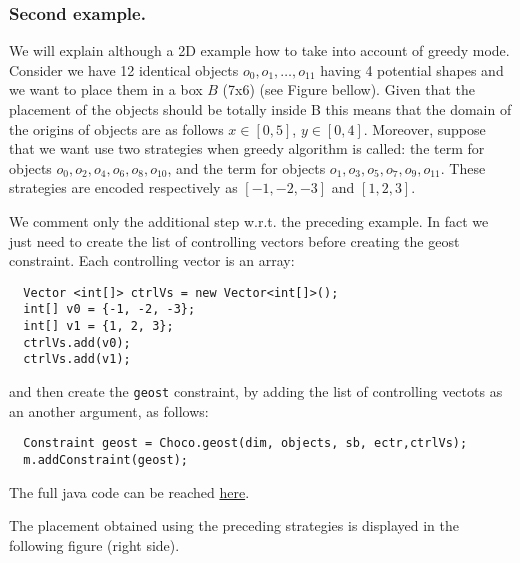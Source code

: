 \subsubsection{Second example.}\label{geostdescription:secondexample}\hypertarget{geostdescription:secondexample}{}
We will explain although a 2D example how to take into account of greedy mode. Consider we have 12 identical objects $o_0,o_1,\ldots,o_{11}$ having 4 potential shapes and we want to place them in a box $B$ (7x6) (see Figure bellow). Given that the placement of the objects should be totally inside B this means that the domain of the origins of objects are as follows $x\in [0,5]$, $y\in [0,4]$. Moreover, suppose that we want use two strategies when greedy algorithm is called: the term  for objects $o_0, o_2, o_4, o_6, o_8, o_{10}$, and the term  for objects $o_1, o_3, o_5, o_7, o_9, o_{11}$. These strategies are encoded respectively as $[-1,-2,-3]$ and $[1, 2, 3]$.


We comment only the additional step w.r.t. the preceding example. In fact we just need to create the list of controlling vectors before creating the geost constraint. Each controlling vector is an array:
\begin{lstlisting}
  Vector <int[]> ctrlVs = new Vector<int[]>();
  int[] v0 = {-1, -2, -3};
  int[] v1 = {1, 2, 3};
  ctrlVs.add(v0);
  ctrlVs.add(v1);
\end{lstlisting}
and then create the \texttt{geost} constraint, by adding the list of controlling vectots as an another argument, as follows:
\begin{lstlisting}
  Constraint geost = Choco.geost(dim, objects, sb, ectr,ctrlVs);
  m.addConstraint(geost);
\end{lstlisting}

The full java code can be reached \href{media/zip/greddyexp.java}{here}.


The placement obtained using the preceding strategies is displayed in the following figure (right side).


